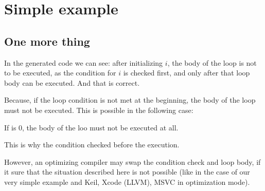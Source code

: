 \section{Simple example}





\subsection{One more thing}

In the generated code we can see: 
after initializing $i$, the body of the loop is not to be executed,
as the condition for $i$ is checked first, and only after that loop body can be executed.
And that is correct. 

Because, if the loop condition is
not met at the beginning, the body of the loop must not be executed.
This is possible in the following case:



If  is 0, the body of the loo must not be executed at all.

This is why the condition checked before the execution.

However, an optimizing compiler may swap the condition check and loop body,
if it sure that the situation described here is
not possible (like in the case of our very simple example and Keil, Xcode (LLVM), MSVC in optimization mode).
